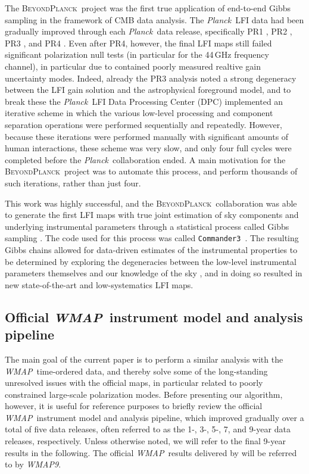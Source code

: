 \documentclass[twocolumn]{../../common/aa}
\def\WMAP{\emph{WMAP}}
\def\WMAPnine{\emph{WMAP9}}
\def\Planck{\emph{Planck}}
\def\commanderthree{\texttt{Commander3}}
\newcommand{\BP}{\textsc{BeyondPlanck}}
\newcommand{\bp}{\textsc{BeyondPlanck}}
\begin{document}
The \bp\ project \citep{bp01} was the first true application of end-to-end Gibbs sampling in the framework of CMB data analysis. The \Planck\ LFI data had been gradually improved through each \Planck\ data release, specifically  PR1 \citep{planck2014-a03}, PR2 \citep{planck2014-a03}, PR3 \citep{planck2016-l02}, and PR4 \citep{planck2014-a03}. Even after PR4, however, the final LFI maps still failed significant polarization null tests (in particular for the 44\,GHz frequency channel), in particular due to contained poorly measured realtive gain uncertainty modes. Indeed, already the PR3 analysis noted a strong degeneracy between the LFI gain solution and the astrophysical foreground model, and to break these the \Planck\ LFI Data Processing Center (DPC) implemented an iterative scheme in which the various low-level processing and component separation operations were performed sequentially and repeatedly. However, because these iterations were performed manually with significant amounts of human interactions, these scheme was very slow, and only four full cycles were completed before the \Planck\ collaboration ended. A main motivation for the \BP\ project was to automate this process, and perform thousands of such iterations, rather than just four. 

This work was highly successful, and the \bp\ collaboration was able to generate the first LFI maps with true joint estimation of sky components and underlying instrumental parameters through a statistical process called Gibbs sampling \citep{bp01,bp03,bp10}. The code used for this process was called \commanderthree\ \citep{bp03}. The resulting Gibbs chains allowed for data-driven estimates of the instrumental properties to be determined by exploring the degeneracies between the low-level instrumental parameters themselves and our knowledge of the sky \citep{bp13,bp14}, and in doing so resulted in new state-of-the-art and low-systematics LFI maps.

\subsection{Official \WMAP\ instrument model and analysis pipeline}
\label{sec:official_pipeline}

The main goal of the current paper is to perform a similar analysis with the \WMAP\ time-ordered data, and thereby solve some of the long-standing unresolved issues with the official maps, in particular related to poorly constrained large-scale polarization modes. Before presenting our algorithm, however, it is useful for reference purposes to briefly review the official \WMAP\ instrument model and analysis pipeline, which improved gradually over a total of five data releases, often referred to as the 1-, 3-, 5-, 7, and 9-year data releases, respectively. Unless otherwise noted, we will refer to the final 9-year results in the following. The official \WMAP\ results delivered by \citet{bennett2012} will be referred to by \WMAPnine.
\end{document}
